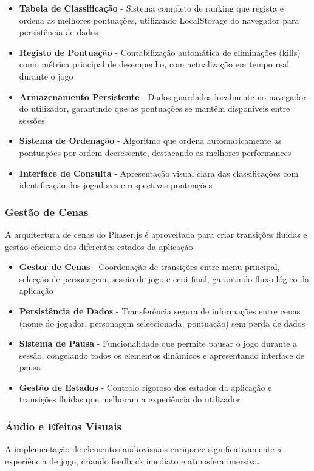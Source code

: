 \begin{itemize}
  \item \textbf{Tabela de Classificação} - Sistema completo de ranking que regista e ordena as melhores pontuações, utilizando LocalStorage do navegador para persistência de dados
  \item \textbf{Registo de Pontuação} - Contabilização automática de eliminações (kills) como métrica principal de desempenho, com actualização em tempo real durante o jogo
  \item \textbf{Armazenamento Persistente} - Dados guardados localmente no navegador do utilizador, garantindo que as pontuações se mantêm disponíveis entre sessões
  \item \textbf{Sistema de Ordenação} - Algoritmo que ordena automaticamente as pontuações por ordem decrescente, destacando as melhores performances
  \item \textbf{Interface de Consulta} - Apresentação visual clara das classificações com identificação dos jogadores e respectivas pontuações
\end{itemize}

\subsubsection{Gestão de Cenas}
\hspace{2em} A arquitectura de cenas do Phaser.js é aproveitada para criar transições fluidas e gestão eficiente dos diferentes estados da aplicação.

\begin{itemize}
  \item \textbf{Gestor de Cenas} - Coordenação de transições entre menu principal, selecção de personagem, sessão de jogo e ecrã final, garantindo fluxo lógico da aplicação
  \item \textbf{Persistência de Dados} - Transferência segura de informações entre cenas (nome do jogador, personagem seleccionada, pontuação) sem perda de dados
  \item \textbf{Sistema de Pausa} - Funcionalidade que permite pausar o jogo durante a sessão, congelando todos os elementos dinâmicos e apresentando interface de pausa
  \item \textbf{Gestão de Estados} - Controlo rigoroso dos estados da aplicação e transições fluidas que melhoram a experiência do utilizador
\end{itemize}

\subsubsection{Áudio e Efeitos Visuais}
\hspace{2em} A implementação de elementos audiovisuais enriquece significativamente a experiência de jogo, criando feedback imediato e atmosfera imersiva.

